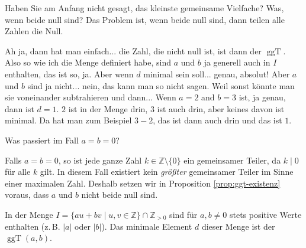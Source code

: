 \begin{student-interaction}[Studentenfrage]
Haben Sie am Anfang nicht gesagt, das kleinste gemeinsame Vielfache? Was, wenn beide null sind? Das Problem ist, wenn beide null sind, dann teilen alle Zahlen die Null.
\end{student-interaction}

\begin{spoken-clean}[00:24:50 - 00:26:41]
Ah ja, dann hat man einfach... die Zahl, die nicht null ist, ist dann der $\operatorname{ggT}$. Also so wie ich die Menge definiert habe, sind $a$ und $b$ ja generell auch in $I$ enthalten, das ist so, ja. Aber wenn $d$ minimal sein soll... genau, absolut! Aber $a$ und $b$ sind ja nicht... nein, das kann man so nicht sagen.  Weil sonst könnte man sie voneinander subtrahieren und dann... Wenn $a = 2$ and $b = 3$ ist, ja genau, dann ist $d = 1$. $2$ ist in der Menge drin, $3$ ist auch drin, aber keines davon ist minimal. Da hat man zum Beispiel $3 - 2$, das ist dann auch drin und das ist $1$.
\end{spoken-clean}

\begin{student-interaction}[Studentenfrage]
Was passiert im Fall $a = b = 0$?
\end{student-interaction}

\begin{math-stroke}
\begin{explanation-of-steps}
Falls $a = b = 0$, so ist jede ganze Zahl $k \in \mathbb{Z} \setminus \{0\}$ ein gemeinsamer Teiler, da $k \mid 0$ für alle $k$ gilt. In diesem Fall existiert kein \emph{größter} gemeinsamer Teiler im Sinne einer maximalen Zahl. Deshalb setzen wir in Proposition \ref{prop:ggt-existenz} voraus, dass $a$ und $b$ nicht beide null sind.

In der Menge $I = \{ au + bv \mid u, v \in \mathbb{Z} \} \cap \mathbb{Z}_{>0}$ sind für $a, b \neq 0$ stets positive Werte enthalten (z.\,B. $|a|$ oder $|b|$). Das minimale Element $d$ dieser Menge ist der $\operatorname{ggT}(a, b)$.
\end{explanation-of-steps}
\end{math-stroke}

